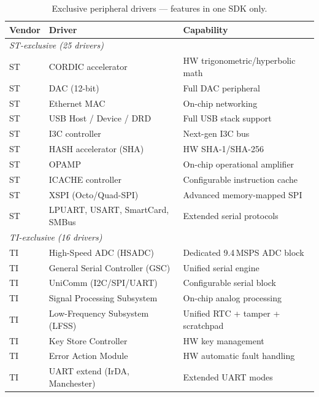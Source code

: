 \begin{table}[H]
\centering
\caption{Exclusive peripheral drivers --- features in one SDK only.}
\label{tab:ti-periph-exclusive}
\begin{tabular}{l p{5.5cm} l}
\toprule
\textbf{Vendor} & \textbf{Driver} & \textbf{Capability} \\
\midrule
\multicolumn{3}{l}{\textit{ST-exclusive (25 drivers)}} \\
ST & CORDIC accelerator              & HW trigonometric/hyperbolic math \\
ST & DAC (12-bit)                    & Full DAC peripheral \\
ST & Ethernet MAC                    & On-chip networking \\
ST & USB Host / Device / DRD         & Full USB stack support \\
ST & I3C controller                  & Next-gen I3C bus \\
ST & HASH accelerator (SHA)          & HW SHA-1/SHA-256 \\
ST & OPAMP                           & On-chip operational amplifier \\
ST & ICACHE controller               & Configurable instruction cache \\
ST & XSPI (Octo/Quad-SPI)           & Advanced memory-mapped SPI \\
ST & LPUART, USART, SmartCard, SMBus & Extended serial protocols \\
\midrule
\multicolumn{3}{l}{\textit{TI-exclusive (16 drivers)}} \\
TI & High-Speed ADC (HSADC)          & Dedicated 9.4\,MSPS ADC block \\
TI & General Serial Controller (GSC) & Unified serial engine \\
TI & UniComm (I2C/SPI/UART)          & Configurable serial block \\
TI & Signal Processing Subsystem     & On-chip analog processing \\
TI & Low-Frequency Subsystem (LFSS)  & Unified RTC + tamper + scratchpad \\
TI & Key Store Controller            & HW key management \\
TI & Error Action Module             & HW automatic fault handling \\
TI & UART extend (IrDA, Manchester)  & Extended UART modes \\
\bottomrule
\end{tabular}
\end{table}


